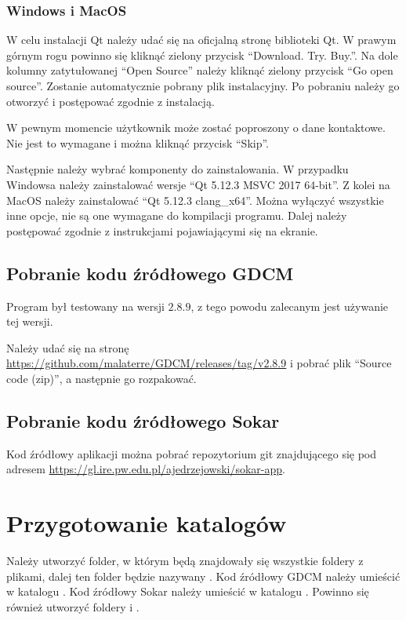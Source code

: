 \subsubsection*{Windows i MacOS}

\par
W celu instalacji Qt należy udać się na oficjalną stronę biblioteki Qt.
W prawym górnym rogu powinno się kliknąć zielony przycisk \enquote{Download. Try. Buy.}.
Na dole kolumny zatytułowanej \enquote{Open Source} należy kliknąć zielony przycisk \enquote{Go open source}.
Zostanie automatycznie pobrany plik instalacyjny.
Po pobraniu należy go otworzyć i postępować zgodnie z instalacją.
\par
W pewnym momencie użytkownik może zostać poproszony o dane kontaktowe.
Nie jest to wymagane i można kliknąć przycisk \enquote{Skip}.
\par
Następnie należy wybrać komponenty do zainstalowania.
W przypadku Windowsa należy zainstalować wersje \enquote{Qt 5.12.3 MSVC 2017 64-bit}.
Z kolei na MacOS należy zainstalować \enquote{Qt 5.12.3 clang\_x64}.
Można wyłączyć wszystkie inne opcje, nie są one wymagane do kompilacji programu.
Dalej należy postępować zgodnie z instrukcjami pojawiającymi się na ekranie.

\subsection{Pobranie kodu źródłowego GDCM}

Program był testowany na wersji $2.8.9$, z tego powodu zalecanym jest używanie tej wersji.
\par
Należy udać się na stronę \url{https://github.com/malaterre/GDCM/releases/tag/v2.8.9} i pobrać plik \enquote{Source code (zip)}, a następnie go rozpakować.

\subsection{Pobranie kodu źródłowego Sokar}

Kod źródłowy aplikacji można pobrać repozytorium git znajdującego się pod adresem \url{https://gl.ire.pw.edu.pl/ajedrzejowski/sokar-app}.

\section{Przygotowanie katalogów}

Należy utworzyć folder, w którym będą znajdowały się wszystkie foldery z plikami, dalej ten folder będzie nazywany .
Kod źródłowy GDCM należy umieścić w katalogu .
Kod źródłowy Sokar należy umieścić w katalogu .
Powinno się również utworzyć foldery  i .

